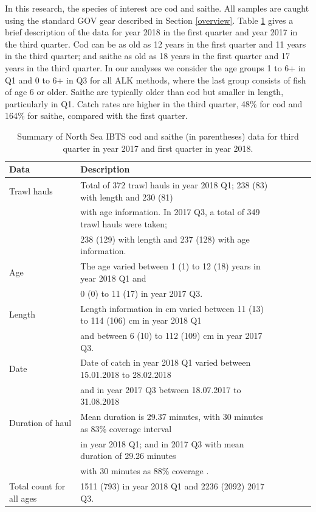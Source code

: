 \documentclass[a4paper 12pt]{article}
\numberwithin{equation}{section}
\begin{document}
In this research, the species of interest are cod and saithe. All samples are caught using the standard GOV gear described in Section \ref{overview}. Table \ref{tab:data2018} gives a brief description of the data for year 2018 in the first quarter and year 2017 in the third quarter.  Cod can be as old as 12 years in the first quarter and 11 years in the third quarter; and saithe as old as 18 years in the first quarter and 17 years in the third quarter. In our analyses we consider the age groups 1 to 6+ in Q1 and 0 to 6+ in Q3 for all ALK methods, where the last group consists of fish of age 6 or older. Saithe are typically older than cod but smaller in length, particularly in Q1. Catch rates are higher in the third quarter, 48\% for cod and 164\% for saithe, compared with the first quarter.\\

\clearpage
\begin{small}
\begin{table}[h!]
\caption{Summary of North Sea IBTS cod and saithe (in parentheses) data for third quarter in year 2017 and first quarter in year 2018.}
\begin{tabular}{llllll}
\toprule
\bf Data&\bf Description \\
\midrule
Trawl hauls  & Total of 372 trawl hauls in year 2018 Q1; 238 (83)  with length and 230 (81) \\ & with age information. In 2017 Q3, a total of 349 trawl hauls were taken; \\ & 238 (129) with length and 237 (128) with age information. \\[1.7ex]

Age &The age varied between 1 (1) to 12 (18) years in year 2018 Q1 and \\ & 0 (0) to 11 (17) in year 2017 Q3. \\[1.7ex]

Length & Length information in cm varied between 11 (13) to 114 (106) cm in year 2018 Q1 \\ & and between 6 (10) to 112 (109) cm in year 2017 Q3. \\[1.7ex]

Date&Date of catch in year 2018 Q1 varied between 15.01.2018 to 28.02.2018 \\ & and in year 2017 Q3 between 18.07.2017 to 31.08.2018 \\[1.7ex]

Duration of haul & Mean duration is 29.37 minutes, with 30 minutes as 83\% coverage interval \\ & in year 2018 Q1; and in 2017 Q3 with mean duration of 29.26 minutes \\ & with 30 minutes as 88\% coverage . \\[1.7ex]

Total count for all ages & 1511 (793) in year 2018 Q1 and 2236 (2092) 2017 Q3. \\[0.5ex]
\bottomrule
\end{tabular}
\label{tab:data2018}
\end{table}
\end{small}
\end{document}
